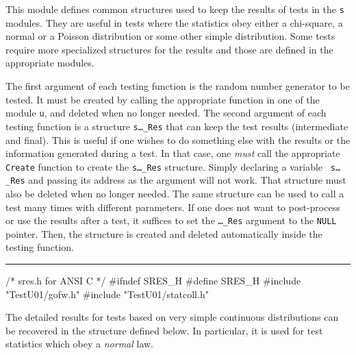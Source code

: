 
This module defines common structures used to keep the results of tests
in the {\tt s} modules. They are useful in tests where the statistics
obey either a chi-square, a normal or a Poisson distribution or some other
simple distribution. Some tests require more specialized structures for
the results and those are defined in the appropriate modules.

The first argument of each testing function is the random number generator
to be tested. It must be created by calling the appropriate function
in one of the module {\tt u}, and deleted when no longer needed.
The second argument of each testing function is a structure
{\tt s\ldots\_Res} that can keep the test results (intermediate and final).
This is useful if one wishes to do something else with the
results or the information generated during a test. In that case, one
{\it must} call the appropriate {\tt Create} function to create the
 {\tt s\ldots\_Res} structure. Simply declaring a variable  {\tt
s\ldots\_Res} and passing its address as the argument will not work.
That structure must also be deleted when no longer needed.
The same structure can
be used to call a test many times with different parameters.
If one does not want to post-process or use the results after a test,
it suffices to set the {\tt \ldots\_Res} argument to the {\tt NULL} pointer.
Then, the structure is created and deleted automatically inside the
testing function.


\bigskip\hrule
\code\hide
/* sres.h  for ANSI C */
#ifndef SRES_H
#define SRES_H
\endhide
#include "TestU01/gofw.h"
#include "TestU01/statcoll.h"
\endcode




The detailed results for tests based on very simple continuous
distributions can be recovered in the structure defined below. In
 particular, it is used for test statistics which obey a {\em normal\/} law.

\code

